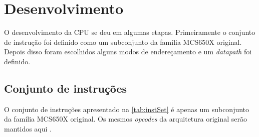 \documentclass[
	12pt,				  %
	openright,		%
	a4paper,			%
	english,			%
	french,				%
	spanish,			%
	brazil,				%
]{abntex2}
\begin{document}

\chapter{Desenvolvimento}

O desenvolvimento da CPU se deu em algumas etapas. Primeiramente o conjunto de
instrução foi definido como um subconjunto da família MCS650X original. Depois
disso foram escolhidos alguns modos de endereçamento e um \emph{datapath} foi
definido.

\section{Conjunto de instruções}
O conjunto de instruções apresentado na \autoref{tab:instSet} é apenas um
subconjunto da família MCS650X original. Os mesmos \emph{opcodes} da arquitetura
original serão mantidos aqui \cite{6502isa}.
\end{document}
